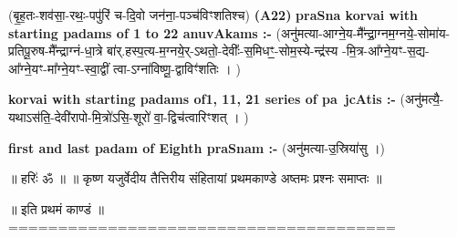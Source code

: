 \documentclass[17pt]{extarticle}
\begin{document}
                  \newline
                      (बृ॒ह॒तः-शव॑सा॒-रथः॒-पपु॑रिं च-दि॒वो जन॑ना॒-पञ्च॑विꣳशतिश्च)  \textbf{(A22)} \newline \newline
                \textbf{praSna korvai with starting padams of 1 to 22 anuvAkams :-} \newline
        (अनु॑मत्या-आग्ने॒य-मै᳚न्द्रा॒ग्नम॒ग्नये॒-सोमा॑य-प्रतिपू॒रुष-मै᳚न्द्राग्नं-धा॒त्रे बा॑र्.हस्प॒त्य-म॒ग्नये॒र्-ऽथतो॒-देवीः᳚-स॒मिधꣳ॒॒-सोम॒स्ये-न्द्र॑स्य -मि॒त्र-आ᳚ग्ने॒यꣳ-स॒द्य-आ᳚ग्ने॒यꣳ-मा᳚ग्ने॒यꣳ-स्वा॒द्वीं त्वा-ऽग्ना॑विष्णू॒-द्वाविꣳ॑शतिः । ) \newline

        \textbf{korvai with starting padams of1, 11, 21 series of pa~jcAtis :-} \newline
        (अनु॑मत्यै॒-यथाऽस॑ति॒-देवी॑रापो-मि॒त्रो॑ऽसि॒-शूरो॑ वा॒-द्विच॑त्वारिꣳशत् । ) \newline

        \textbf{first and last padam of Eighth praSnam :-} \newline
        (अनु॑मत्या-उ॒स्रिया॑सु ।) \newline 

        
        ॥ हरिः॑ ॐ ॥
॥ कृष्ण यजुर्वेदीय तैत्तिरीय संहितायां 
प्रथमकाण्डे अष्तमः प्रश्नः समाप्तः ॥

॥ इति प्रथमं काण्डं ॥
======================================= \newline
        \pagebreak
                \pagebreak
        
\end{document}
